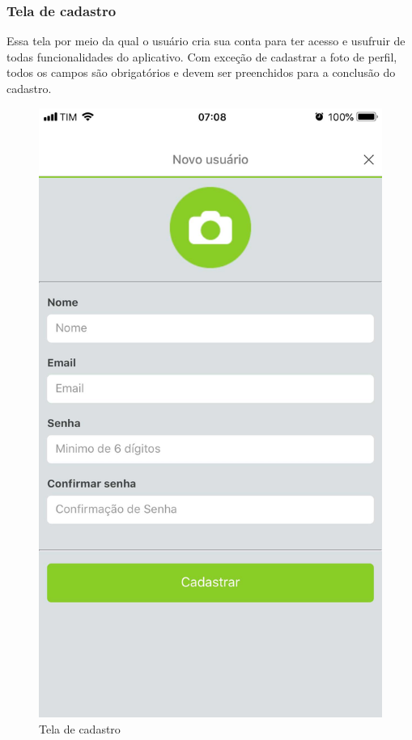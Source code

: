 \subsubsection{Tela de cadastro}
Essa tela por meio da qual o usuário cria sua conta para ter acesso e usufruir de todas funcionalidades do aplicativo. Com exceção de cadastrar a foto de perfil, todos os campos são obrigatórios e devem ser preenchidos para a conclusão do cadastro.

\begin{figure}[H]
	\caption{\label{fig:tela-de-1}Tela de cadastro}
	\centering
	\includegraphics[scale=0.15]{imagens/figura12.jpg}
\end{figure}



